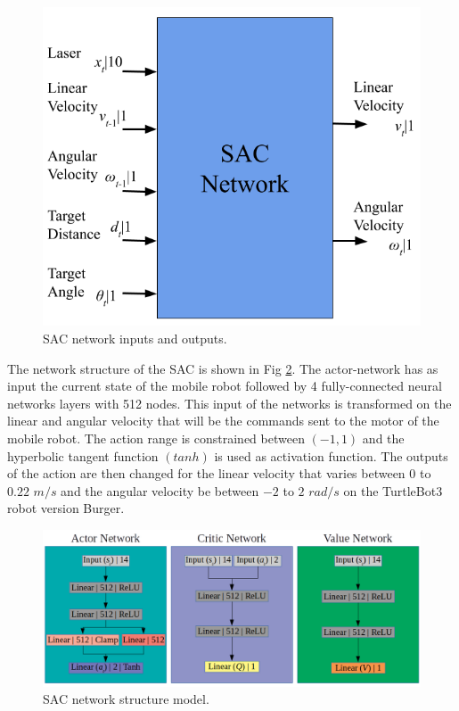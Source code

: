 \begin{figure}[htbp]
\centerline{\includegraphics[width=\columnwidth]{images/output_and_input.png}}
\caption{SAC network inputs and outputs.}
\label{fig:entradaESaida}
\end{figure}

The network structure of the SAC is shown in Fig \ref{fig:projetointegrador}. 
The actor-network has as input the current state of the mobile robot followed by 4 fully-connected neural networks layers with 512 nodes.
This input of the networks is transformed on the linear and angular velocity that will be the commands sent to the motor of the mobile robot. 
The action range is constrained between $(-1,1)$ and the hyperbolic tangent function $(tanh)$ is used as activation function.
The outputs of the action are then changed for the linear velocity that varies between $0$ to $0.22$ $m/s$ and the angular velocity be between $-2$ to $2$ $rad/s$ on the TurtleBot3 robot version Burger.


\begin{figure}[htbp]
\centerline{\includegraphics[width=\columnwidth]{images/structure_sac.png}}
\caption{SAC network structure model.}
\label{fig:projetointegrador}
\end{figure}

